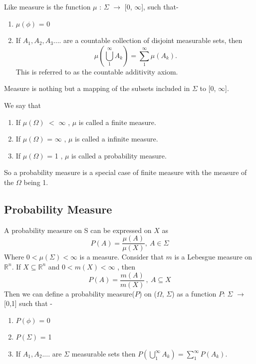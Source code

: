 \documentclass{article}
\begin{document}
Like measure is the function $\mu$ : $\Sigma$ $\rightarrow$ [0, $\infty$], such that-
\begin{enumerate}
    \item $\mu(\phi)$ = 0
    \item If $A_{1}, A_{2} ,A_{3} ....$ are a countable collection of disjoint measurable sets, then  $$\mu(\bigcup_{1}^{\infty} {A_k}) = \sum_{1}^{\infty}\mu(A_k).$$ This is referred to as the countable additivity axiom.
\end{enumerate}

Measure is nothing but a mapping of the subsets included in $\Sigma$ to [0, $\infty$].
\bigskip

We say that
\begin{enumerate}
    \item If $\mu(\Omega)$ $<$ $\infty$ , $\mu$ is called a finite measure.
    \item If $\mu(\Omega)$ = $\infty$ , $\mu$ is called a infinite measure.
    \item If $\mu(\Omega)$ =  1 , $\mu$ is called a probability measure.
\end{enumerate}

So a probability measure is a special case of finite measure with the measure of the $\Omega$ being 1.
\bigskip

\subsection{Probability Measure}

A probability measure on S can be expressed on $X$ as
$$P(A) = \frac{\mu(A)}{\mu(X)}, \ A \in \Sigma$$
Where $0 < \mu(\Sigma) < \infty$ is a measure.
\newline
\newline
Consider that $m$ is a Lebesgue measure on $\mathbb{R}^n$. If $X \subseteq  \mathbb{R}^n$ and $0 < m(X) < \infty$ , then
$$P(A) = \frac{m(A)}{m(X)}\,, \ A \subseteq X$$
Then we can define a probability measure($P$) on ($\Omega$, $\Sigma$) as a function $P$: $\Sigma$ $\rightarrow$ [0,1] such that -
\begin{enumerate}
    \item $P(\phi)$ = 0
    \item $P(\Sigma)$ = 1
    \item If $A_{1}, A_{2} .... $ are $\Sigma$ measurable sets then $P(\bigcup_{1}^{\infty} {A_k}) = \sum_{1}^{\infty}P(A_k)$.
\end{enumerate}
\end{document}

